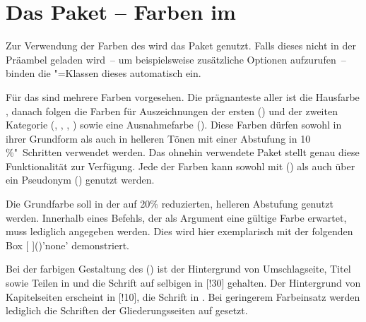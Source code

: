 \section{Das Paket  -- Farben im \CD}%
%
%
%
\begin{Bundle*}{}
Zur Verwendung der Farben des \CDs wird das Paket  
genutzt. Falls dieses nicht in der Präambel geladen wird~-- um beispielsweise 
zusätzliche Optionen aufzurufen~-- binden die \TUDScript"=Klassen dieses 
automatisch ein.

Für das \CD sind mehrere Farben vorgesehen. Die prägnanteste aller ist die 
Hausfarbe , danach folgen die Farben für Auszeichnungen der ersten
() und der zweiten Kategorie (, , 
, ) sowie eine Ausnahmefarbe (). 
Diese Farben dürfen sowohl in ihrer Grundform als auch in helleren Tönen mit 
einer Abstufung in 10\,\%"~Schritten verwendet werden. Das ohnehin verwendete 
Paket  stellt genau diese Funktionalität zur Verfügung. Jede 
der Farben kann sowohl mit () als auch über ein 
Pseudonym () genutzt werden.
%
\begin{Example*}
Die Grundfarbe  soll in der auf 20\% reduzierten, helleren 
Abstufung genutzt werden. Innerhalb eines Befehls, der als Argument eine 
gültige Farbe erwartet, muss lediglich  angegeben werden. 
Dies wird hier exemplarisch mit der folgenden \colorbox{HKS44!20}{%
  Box [%
  ]()'none'%
} demonstriert.
\end{Example*}
%
Bei der farbigen Gestaltung des \CDs () ist der Hintergrund 
von Umschlagseite, Titel sowie Teilen in  und die Schrift auf 
selbigen in [!30] gehalten. Der Hintergrund von Kapitelseiten 
erscheint in [!10], die Schrift in . Bei geringerem 
Farbeinsatz werden lediglich die Schriften der Gliederungsseiten auf 
 gesetzt.


\end{Bundle*}
